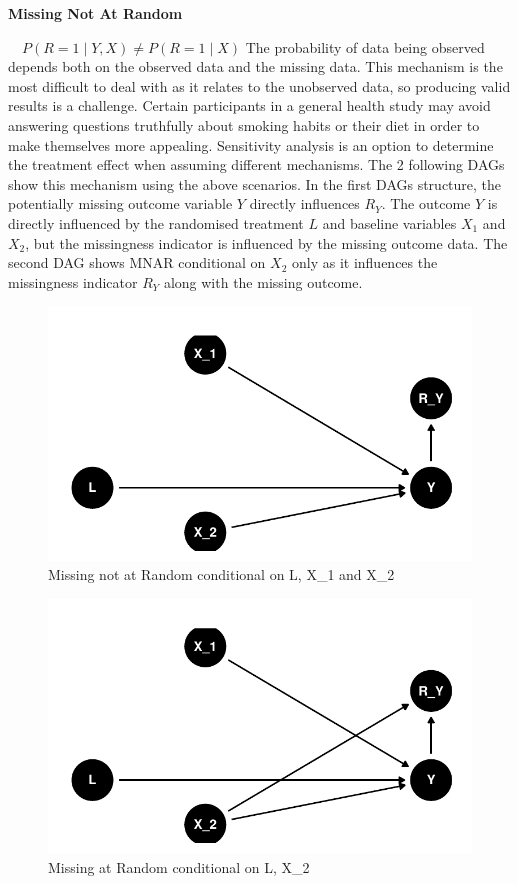 \documentclass{article}
\newcommand{\pandocbounded}[1]{#1}
\begin{document}
\textbf{Missing Not At Random}

\(\quad P(R = 1 \mid Y, X) \ne P(R = 1 \mid X)\) The probability of data
being observed depends both on the observed data and the missing data.
This mechanism is the most difficult to deal with as it relates to the
unobserved data, so producing valid results is a challenge. Certain
participants in a general health study may avoid answering questions
truthfully about smoking habits or their diet in order to make
themselves more appealing. Sensitivity analysis is an option to
determine the treatment effect when assuming different mechanisms. The 2
following DAGs show this mechanism using the above scenarios. In the
first DAGs structure, the potentially missing outcome variable \(Y\)
directly influences \(R_Y\). The outcome \(Y\) is directly influenced by
the randomised treatment \(L\) and baseline variables \(X_1\) and
\(X_2\), but the missingness indicator is influenced by the missing
outcome data. The second DAG shows MNAR conditional on \(X_2\) only as
it influences the missingness indicator \(R_Y\) along with the missing
outcome.

\begin{figure}
\centering
\pandocbounded{\includegraphics[keepaspectratio]{Final_Report_files/figure-latex/unnamed-chunk-4-1.pdf}}
\caption{Missing not at Random conditional on L, X\_1 and X\_2}
\end{figure}

\begin{figure}
\centering
\pandocbounded{\includegraphics[keepaspectratio]{Final_Report_files/figure-latex/unnamed-chunk-5-1.pdf}}
\caption{Missing at Random conditional on L, X\_2}
\end{figure}
\end{document}
